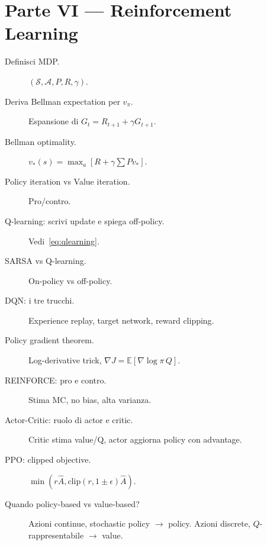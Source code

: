 \section{Parte VI — Reinforcement Learning}

\begin{description}
  \item[Definisci MDP.] $(\mathcal{S}, \mathcal{A}, P, R, \gamma)$.
  \item[Deriva Bellman expectation per $v_\pi$.] Espansione di $G_t = R_{t+1} + \gamma G_{t+1}$.
  \item[Bellman optimality.] $v_*(s) = \max_a [R + \gamma \sum P v_*]$.
  \item[Policy iteration vs Value iteration.] Pro/contro.
  \item[Q-learning: scrivi update e spiega off-policy.] Vedi~\eqref{eq:qlearning}.
  \item[SARSA vs Q-learning.] On-policy vs off-policy.
  \item[DQN: i tre trucchi.] Experience replay, target network, reward clipping.
  \item[Policy gradient theorem.] Log-derivative trick, $\nabla J = \mathbb{E}[\nabla\log\pi\, Q]$.
  \item[REINFORCE: pro e contro.] Stima MC, no bias, alta varianza.
  \item[Actor-Critic: ruolo di actor e critic.] Critic stima value/Q, actor aggiorna policy con advantage.
  \item[PPO: clipped objective.] $\min(r\hat A, \mathrm{clip}(r,1\pm\epsilon)\hat A)$.
  \item[Quando policy-based vs value-based?] Azioni continue, stochastic policy $\to$ policy. Azioni discrete, $Q$-rappresentabile $\to$ value.
\end{description}
